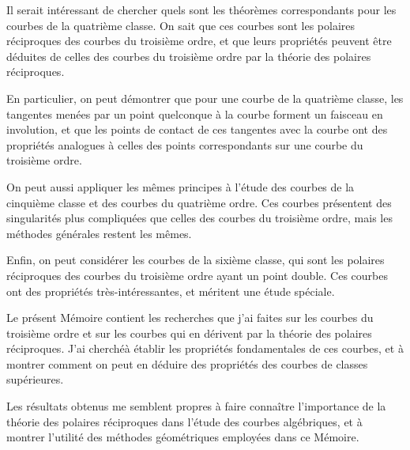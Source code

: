 \documentclass[11pt,a4paper]{book}
\begin{document}
\newpage
\setcounter{page}{194}

Il serait int\'{e}ressant de chercher quels sont les th\'{e}or\`{e}mes correspondants pour les
courbes de la quatri\`{e}me classe. On sait que ces courbes sont les polaires r\'{e}ciproques des
courbes du troisi\`{e}me ordre, et que leurs propri\'{e}t\'{e}s peuvent \^{e}tre d\'{e}duites de celles des courbes
du troisi\`{e}me ordre par la th\'{e}orie des polaires r\'{e}ciproques.

En particulier, on peut d\'{e}montrer que pour une courbe de la quatri\`{e}me classe, les
tangentes men\'{e}es par un point quelconque \`{a} la courbe forment un faisceau en involution,
et que les points de contact de ces tangentes avec la courbe ont des propri\'{e}t\'{e}s analogues
\`{a} celles des points correspondants sur une courbe du troisi\`{e}me ordre.

\newpage
\setcounter{page}{195}

On peut aussi appliquer les m\^{e}mes principes \`{a} l'\'{e}tude des courbes de la cinqui\`{e}me
classe et des courbes du quatri\`{e}me ordre. Ces courbes pr\'{e}sentent des singularit\'{e}s plus
compliqu\'{e}es que celles des courbes du troisi\`{e}me ordre, mais les m\'{e}thodes g\'{e}n\'{e}rales restent
les m\^{e}mes.

Enfin, on peut consid\'{e}rer les courbes de la sixi\`{e}me classe, qui sont les polaires
r\'{e}ciproques des courbes du troisi\`{e}me ordre ayant un point double. Ces courbes ont des
propri\'{e}t\'{e}s tr\`{e}s-int\'{e}ressantes, et m\'{e}ritent une \'{e}tude sp\'{e}ciale.

\newpage
\setcounter{page}{196}

Le pr\'{e}sent M\'{e}moire contient les recherches que j'ai faites sur les courbes du troisi\`{e}me
ordre et sur les courbes qui en d\'{e}rivent par la th\'{e}orie des polaires r\'{e}ciproques. J'ai cherch\'{e}\`{a}
\'{e}tablir les propri\'{e}t\'{e}s fondamentales de ces courbes, et \`{a} montrer comment on peut en
d\'{e}duire des propri\'{e}t\'{e}s des courbes de classes sup\'{e}rieures.

Les r\'{e}sultats obtenus me semblent propres \`{a} faire conna\^{i}tre l'importance de la th\'{e}orie
des polaires r\'{e}ciproques dans l'\'{e}tude des courbes alg\'{e}briques, et \`{a} montrer l'utilit\'{e} des
m\'{e}thodes g\'{e}om\'{e}triques employ\'{e}es dans ce M\'{e}moire.

\end{document}
